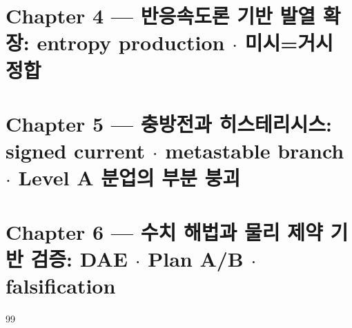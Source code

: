 \documentclass[11pt,a4paper]{article}
\begin{document}
\part*{Chapter 4 — 반응속도론 기반 발열 확장: entropy production $\cdot$ 미시=거시 정합}
\setcounter{section}{0}
\renewcommand{\thesection}{4.\arabic{section}}
\renewcommand{\thesubsection}{4.\arabic{section}.\arabic{subsection}}

\clearpage

\part*{Chapter 5 — 충방전과 히스테리시스: signed current $\cdot$ metastable branch $\cdot$ Level A 분업의 부분 붕괴}
\setcounter{section}{0}
\renewcommand{\thesection}{5.\arabic{section}}
\renewcommand{\thesubsection}{5.\arabic{section}.\arabic{subsection}}

\clearpage

\part*{Chapter 6 — 수치 해법과 물리 제약 기반 검증: DAE $\cdot$ Plan A/B $\cdot$ falsification}
\setcounter{section}{0}
\renewcommand{\thesection}{6.\arabic{section}}
\renewcommand{\thesubsection}{6.\arabic{section}.\arabic{subsection}}

\clearpage

\begin{thebibliography}{99}

\end{thebibliography}
\end{document}
